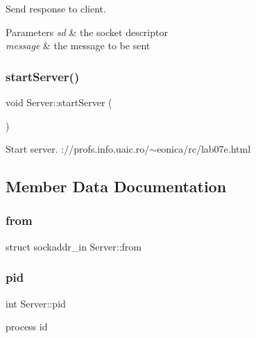 Send response to client. 
\begin{DoxyParams}{Parameters}
{\em sd} & the socket descriptor \\
\hline
{\em message} & the message to be sent \\
\hline
\end{DoxyParams}
\mbox{\label{classServer_af59bb3a96b3311ed2b87e2d6899d9f79}} 
\subsubsection{\texorpdfstring{start\+Server()}{startServer()}}
{\footnotesize\ttfamily void Server\+::start\+Server (\begin{DoxyParamCaption}{ }\end{DoxyParamCaption})}

Start server. \+://profs.info.\+uaic.\+ro/$\sim$eonica/rc/lab07e.html

\subsection{Member Data Documentation}
\mbox{\label{classServer_a630123b8292df5f3947d82027ec7991b}} 
\subsubsection{\texorpdfstring{from}{from}}
{\footnotesize\ttfamily struct sockaddr\+\_\+in Server\+::from\hspace{0.3cm}{\ttfamily [private]}}

\mbox{\label{classServer_a519ae955c6db43f4b832626b8d7518a7}} 
\subsubsection{\texorpdfstring{pid}{pid}}
{\footnotesize\ttfamily int Server\+::pid\hspace{0.3cm}{\ttfamily [private]}}

process id \mbox{\label{classServer_a926c9dae229a62b6d33fdbb41dca6d82}} 
